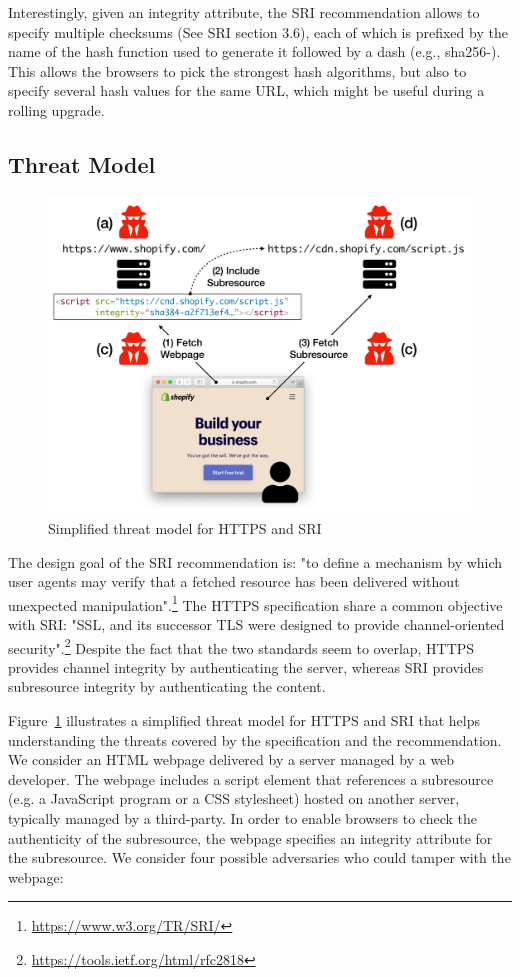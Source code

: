 \documentclass[sigconf,table]{acmart}
\begin{document}
Interestingly, given an integrity attribute, the SRI recommendation allows to specify multiple checksums (See SRI section 3.6), each of which is prefixed by the name of the hash function used to generate it followed by a dash (e.g., sha256-).
This allows the browsers to pick the strongest hash algorithms, but also to specify several hash values for the same URL, which might be useful during a rolling upgrade.
 

\subsection{Threat Model}

\begin{figure}
\includegraphics[width=\columnwidth]{figures/model}
	\caption{Simplified threat model for HTTPS and SRI}
	\label{fig:model}
\end{figure}


The design goal of the SRI recommendation is: "to define a mechanism by which user agents may verify that a fetched resource has been delivered without unexpected manipulation".\footnote{\url{https://www.w3.org/TR/SRI/}}
The HTTPS specification share a common objective with SRI: "SSL, and its successor TLS were designed to provide channel-oriented security".\footnote{\url{https://tools.ietf.org/html/rfc2818}}
Despite the fact that the two standards seem to overlap, HTTPS provides channel integrity by authenticating the server, whereas SRI provides subresource integrity by authenticating the content.

Figure~\ref{fig:model} illustrates a simplified threat model for HTTPS and SRI that helps understanding the threats covered by the specification and the recommendation.
We consider an HTML webpage delivered by a server managed by a web developer. 
The webpage includes a script element that references a subresource (e.g. a JavaScript program or a CSS stylesheet) hosted on another server, typically managed by a third-party.
In order to enable browsers to check the authenticity of the subresource, the webpage specifies an integrity attribute for the subresource.
We consider four possible adversaries who could tamper with the webpage:
\end{document}
